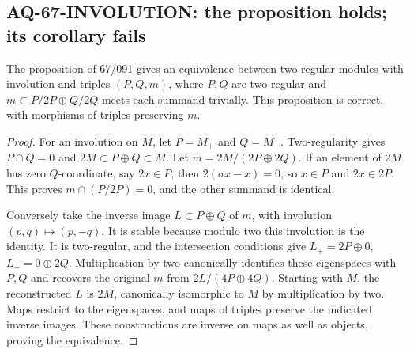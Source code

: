 \documentclass[11pt,a4paper]{article}
\theoremstyle{definition}\newtheorem{definition}[theorem]{Definition}
\theoremstyle{remark}\newtheorem{remark}[theorem]{Remark}
\begin{document}
\subsection{AQ-67-INVOLUTION: the proposition holds; its corollary fails}
The proposition of 67/091 gives an equivalence between
two-regular modules with involution and triples
$(P,Q,m)$, where $P,Q$ are two-regular and
$m\subset P/2P\oplus Q/2Q$ meets each summand trivially.
This proposition is correct, with morphisms of triples
preserving $m$.
\begin{proof}
For an involution on $M$, let $P=M_+$ and $Q=M_-$.
Two-regularity gives $P\cap Q=0$ and
$2M\subset P\oplus Q\subset M$.
Let $m=2M/(2P\oplus2Q)$. If an element of $2M$
has zero $Q$-coordinate, say $2x\in P$, then
$2(\sigma x-x)=0$, so $x\in P$ and $2x\in2P$.
This proves $m\cap(P/2P)=0$, and the other summand
is identical.

Conversely take the inverse image
$L\subset P\oplus Q$ of $m$, with involution
$(p,q)\mapsto(p,-q)$. It is stable because modulo
two this involution is the identity. It is
two-regular, and the intersection conditions give
$L_+=2P\oplus0$, $L_-=0\oplus2Q$.
Multiplication by two canonically identifies these
eigenspaces with $P,Q$ and recovers the original
$m$ from $2L/(4P\oplus4Q)$.
Starting with $M$, the reconstructed $L$ is $2M$,
canonically isomorphic to $M$ by multiplication
by two. Maps restrict to the eigenspaces, and
maps of triples preserve the indicated inverse
images. These constructions are inverse on maps
as well as objects, proving the equivalence.
\end{proof}
\end{document}
